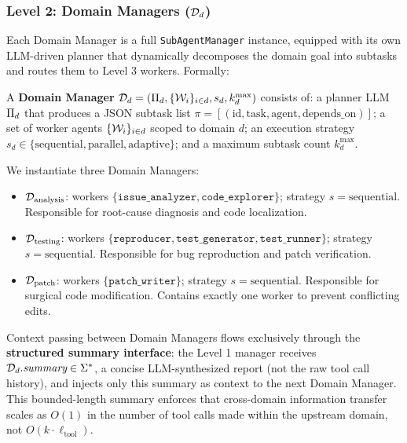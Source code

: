 \subsubsection{Level 2: Domain Managers ($\mathcal{D}_d$)}

Each Domain Manager is a full \texttt{SubAgentManager} instance, equipped
with its own LLM-driven planner that dynamically decomposes the domain
goal into subtasks and routes them to Level 3 workers. Formally:

\begin{definition}
\label{def:domainmgr}
A \textbf{Domain Manager} $\mathcal{D}_d = (\Pi_d, \{\mathcal{W}_i\}_{i \in d},
s_d, k_d^{\max})$ consists of: a planner LLM $\Pi_d$ that produces a
JSON subtask list $\pi = [(\text{id}, \text{task}, \text{agent},
\text{depends\_on})]$; a set of worker agents $\{\mathcal{W}_i\}_{i \in d}$ scoped
to domain $d$; an execution strategy $s_d \in \{\text{sequential},
\text{parallel}, \text{adaptive}\}$; and a maximum subtask count $k_d^{\max}$.
\end{definition}

We instantiate three Domain Managers:

\begin{itemize}
  \item $\mathcal{D}_{\text{analysis}}$: workers $\{\texttt{issue\_analyzer},
  \texttt{code\_explorer}\}$; strategy $s = \text{sequential}$. Responsible
  for root-cause diagnosis and code localization.

  \item $\mathcal{D}_{\text{testing}}$: workers $\{\texttt{reproducer},
  \texttt{test\_generator}, \texttt{test\_runner}\}$; strategy $s =
  \text{sequential}$. Responsible for bug reproduction and patch verification.

  \item $\mathcal{D}_{\text{patch}}$: workers $\{\texttt{patch\_writer}\}$;
  strategy $s = \text{sequential}$. Responsible for surgical code
  modification. Contains exactly one worker to prevent conflicting edits.
\end{itemize}

Context passing between Domain Managers flows exclusively through the
\textbf{structured summary interface}: the Level 1 manager receives
$\mathcal{D}_d.\textit{summary} \in \Sigma^*$, a concise LLM-synthesized report
(not the raw tool call history), and injects only this summary as context
to the next Domain Manager. This bounded-length summary enforces that
cross-domain information transfer scales as $O(1)$ in the number of tool
calls made within the upstream domain, not $O(k \cdot \ell_{\text{tool}})$.


